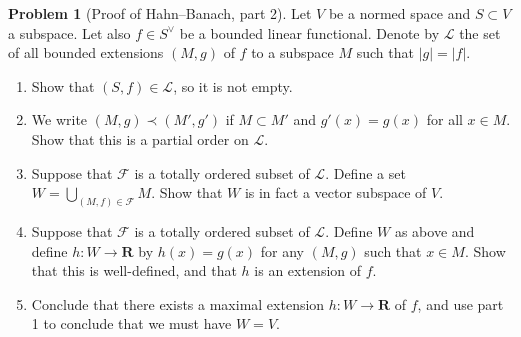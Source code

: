\documentclass[11pt]{article}
\theoremstyle{definition}
\newtheorem{prob}{Problem}
\newcommand{\kk}[1]{\mathbf{#1}}
\newcommand{\cc}[1]{\mathcal{#1}}
\begin{document}
\begin{prob}[Proof of Hahn--Banach, part 2]
Let $V$ be a normed space and $S \subset V$ a subspace.
Let also $f \in S^\vee$ be a bounded linear functional.
Denote by $\cc L$ the set of all bounded extensions $(M, g)$ of $f$ to a
subspace $M$ such that $|g| = |f|$.

\begin{enumerate}
\item
Show that $(S, f) \in \cc L$, so it is not empty.

\item
We write $(M,g) \prec (M',g')$ if $M \subset M'$ and $g'(x) = g(x)$ for all $x
\in M$.
Show that this is a partial order on $\cc L$.

\item
Suppose that $\cc F$ is a totally ordered subset of $\cc L$.
Define a set $W = \bigcup_{(M,f) \in \cc F} M$.
Show that $W$ is in fact a vector subspace of $V$.

\item
Suppose that $\cc F$ is a totally ordered subset of $\cc L$.
Define $W$ as above and define $h : W \to \kk R$ by
\(
h(x) = g(x)
\)
for any $(M,g)$ such that $x \in M$.
Show that this is well-defined, and that $h$ is an extension of $f$.

\item
Conclude that there exists a maximal extension $h : W \to \kk R$ of $f$,
and use part 1 to conclude that we must have $W = V$.
\end{enumerate}
\end{prob}
\end{document}
